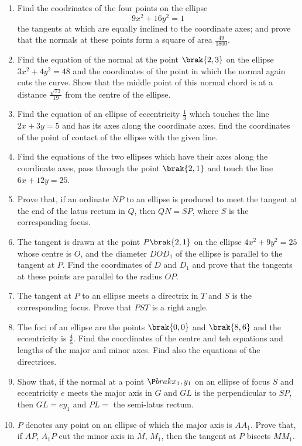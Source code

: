 \begin{enumerate}[1.]
\item Find the coodrinates of the four points on the ellipse
\begin{equation}
9x^2+16y^2 = 1
\end{equation}
the tangents at which are equally inclined to the coordinate axes; and prove that the normals
at these points form a square of area $\frac{49}{1800}$.
\item Find the equation of the normal at the point $\brak{2,3}$ on the ellipse
$3x^2+4y^2 = 48$ and the coordinates of the point in which the normal again cuts the curve.
Show that the middle point of this normal chord is at a distance $\frac{\sqrt{73}}{19}$ from
the centre of the ellipse.
\item Find the equation of an ellipse of eccentricity $\frac{1}{3}$ which 
touches the line $2x+3y=5$ and has its axes along the coordinate axes.  find the coordinates
of the point of contact of the ellipse with the given line.
\item Find the equations of the two ellipses which have their axes along the coordinate axes,
pass through the point $\brak{2,1}$ and touch the line $6x+12y= 25$.  
\item Prove that, if an ordinate $NP$ to an ellipse is produced to meet the tangent at the end
of the latus rectum in $Q$, then $QN = SP$, where $S$ is the corresponding focus.
\item The tangent is drawn at the point $P \brak{2,1}$ on the ellipse $4x^2+9y^2 = 25$ whose
centre is $O$, and the diameter $DOD_1$ of the ellipse is parallel to the tangent at $P$.  
Find the coordinates of $D$ and $D_1$ and prove that the tangents at these points are parallel
to the radius $OP$.  
\item The tangent at $P$ to an ellipse meets a directrix in $T$ and $S$ is the corresponding
focus.  Prove that $PST$ is a right angle.
\item The foci  of an ellipse are the points $\brak{0,0}$ and $\brak{8,6}$ and the
eccentricity is $\frac{4}{5}$.  Find the coordinates of the centre and teh equations and
lengths of the major and minor axes.  Find also the equations of the directrices.
\item Show that, if the normal at a point $\P brak{x_1,y_1}$ on an ellipse of focus $S$
and eccentricity $e$ meets the major axis in $G$ and $GL$ is the perpendicular to $SP$,
then $GL=ey_1$ and $PL = $ the semi-latus rectum.
\item $P$ denotes any point on an ellipse of which the major axis is $AA_1$.  Prove that, if $AP$,
$A_1P$  cut the minor axis in $M$, $M_1$, then the tangent at $P$ bisects $MM_1$.
\end{enumerate}
